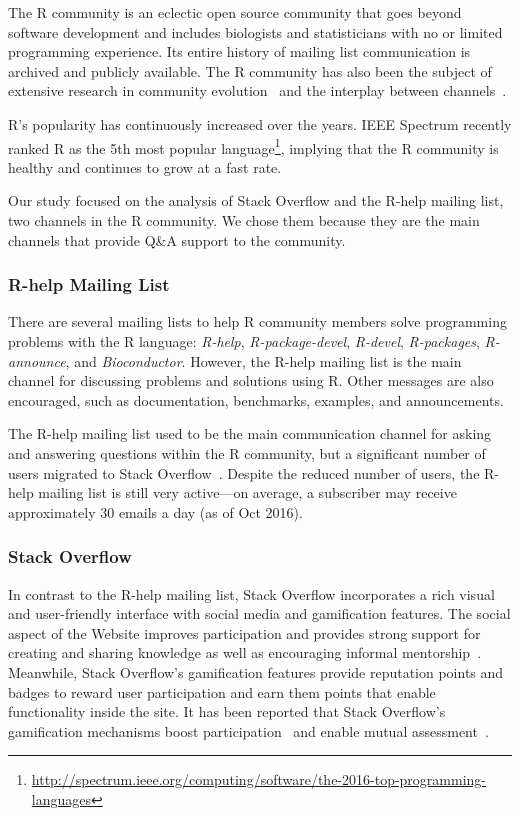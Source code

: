 \documentclass[smallextended]{svjour3}       %
\newcommand{\channel}{communication channel\xspace}
\newcommand{\SO}{Stack Overflow\xspace}
\newcommand{\RH}{R-help\xspace}
\begin{document}
    The R community is an eclectic open source community that goes beyond software development 
    and includes biologists and statisticians with no or limited programming experience.
    Its entire history of mailing list communication is archived and publicly available.
    The R community has also been the subject of extensive research in community evolution~\cite{German2013,Vasi1escu2014PhD} and the interplay between channels~\cite{Vasilescu2014c}.

    R's popularity has continuously increased over the years. 
    IEEE Spectrum recently ranked R as the 5th most popular
    language\footnote{\url{http://spectrum.ieee.org/computing/software/the-2016-top-programming-languages}},
    implying that the R community is healthy and continues to grow at
    a fast rate.

    Our study focused on the analysis of \SO and the \RH mailing list, two channels in the R community.
    We chose them because they are the main channels that provide Q\&A support to the community.

\subsubsection{R-help Mailing List}
    There are several mailing lists to help R community members solve programming problems with the R language: \emph{R-help}, \emph{R-package-devel}, \emph{R-devel}, \emph{R-packages}, \emph{R-announce}, and \emph{Bioconductor}. However, the \RH mailing list is the main channel for discussing problems and solutions using R. Other messages are also encouraged, such as documentation, benchmarks, examples, and announcements.

    The \RH mailing list used to be the main \channel for asking
    and answering questions within the R community, but a significant
    number of users migrated to \SO~\cite{Vasilescu2014c}.
    Despite the reduced number of users, the \RH mailing list is
    still very active---on average, a subscriber may receive
    approximately 30 emails
    a day (as of Oct 2016).

\subsubsection{Stack Overflow}
\label{subsec:Rtag}

    In contrast to the \RH mailing list, \SO incorporates a rich visual and user-friendly interface with social media and gamification features.
    The social aspect of the Website improves participation and provides strong support for creating and sharing knowledge as well as encouraging informal mentorship~\cite{Jenkins2009,Storey2014}.
    Meanwhile, \SO's gamification features provide reputation points and badges to reward user participation and earn them points that enable functionality inside the site.
    It has been reported that \SO's gamification mechanisms boost participation~\cite{Vasi1escu2014PhD} and enable mutual assessment~\cite{Singer2013}.
\end{document}
